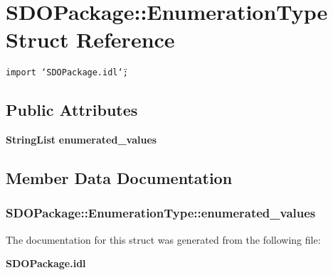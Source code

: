 \section{SDOPackage::Enumeration\-Type Struct Reference}
\label{structSDOPackage_1_1EnumerationType}
{\tt import \char`\"{}SDOPackage.idl\char`\"{};}

\subsection*{Public Attributes}
\begin{CompactItemize}
\item 
{\bf String\-List} {\bf enumerated\_\-values}
\end{CompactItemize}


\subsection{Member Data Documentation}
\subsubsection{ {\bf SDOPackage::Enumeration\-Type::enumerated\_\-values}}\label{structSDOPackage_1_1EnumerationType_SDOPackage_1_1EnumerationTypeo0}




The documentation for this struct was generated from the following file:\begin{CompactItemize}
\item 
{\bf SDOPackage.idl}\end{CompactItemize}
